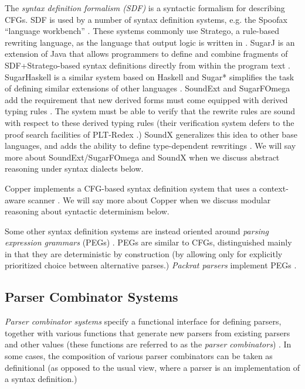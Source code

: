 The \emph{syntax definition formalism  (SDF)}  \cite{journals/sigplan/HeeringHKR89} is a syntactic formalism for describing CFGs. SDF is used by a number of syntax definition systems, e.g. the Spoofax ``language workbench'' \cite{kats2010spoofax}. These systems commonly use Stratego, a rule-based rewriting language, as the language that output logic is written in \cite{Visser-RTA01}. SugarJ is an extension of Java that allows programmers to define and combine fragments of SDF+Stratego-based syntax definitions directly from within the program text \cite{erdweg2011sugarj}. SugarHaskell is a similar system based on Haskell \cite{erdweg2012layout} and Sugar* simplifies the task of defining similar extensions of other languages \cite{erdweg2013framework}. SoundExt and SugarFOmega add the requirement that new derived forms must come equipped with  derived typing rules \cite{conf/icfp/LorenzenE13}. The system must be able to verify that the rewrite rules are sound with respect to these derived typing rules (their verification system defers to the proof search facilities of PLT-Redex \cite{Felleisen-Findler-Flatt09}.) SoundX generalizes this idea to other base languages, and adds the ability to define type-dependent rewritings \cite{conf/popl/LorenzenE16}. We will say more about SoundExt/SugarFOmega and SoundX when we discuss abstract reasoning under syntax dialects below.


Copper implements a CFG-based syntax definition system that uses a context-aware scanner \cite{conf/gpce/WykS07}. We will say more about Copper when we discuss modular reasoning about syntactic determinism below.%


Some other syntax definition systems are instead oriented  around \emph{parsing expression grammars} (PEGs) \cite{Ford04a}. PEGs are similar to CFGs, distinguished mainly in that they are deterministic by construction (by allowing only for explicitly prioritized choice between alternative parses.) \emph{Packrat parsers} implement PEGs \cite{DBLP:journals/corr/abs-cs-0603077}.

\vspace{-5px}\subsection{Parser Combinator Systems}\label{sec:parser-combinators}\vspace{-4px}
\emph{Parser combinator systems} specify a functional interface for defining parsers, together with various functions that generate new parsers from existing parsers and other values (these functions are referred to as the \emph{parser combinators}) \cite{Hutton1992d}. 
In some cases, the composition of various parser combinators can be taken as definitional (as opposed to the usual view, where a parser is an {implementation} of a syntax definition.)

